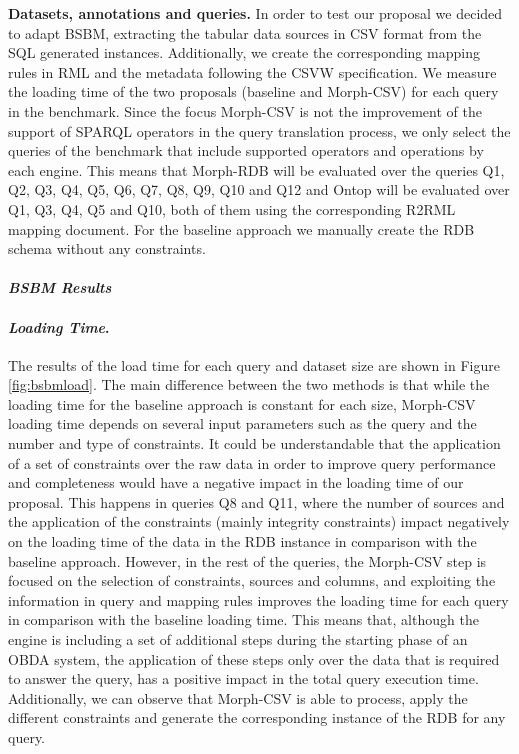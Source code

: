  
\noindent\textbf{Datasets, annotations and queries.} In order to test our proposal we decided to adapt BSBM, extracting the tabular data sources in CSV format from the SQL generated instances. Additionally, we create the corresponding mapping rules in RML and the metadata following the CSVW specification. We measure the loading time of the two proposals (baseline and Morph-CSV) for each query in the benchmark. Since the focus Morph-CSV is not the improvement of the support of SPARQL operators in the query translation process, we only select the queries of the benchmark that include supported operators and operations by each engine. This means that Morph-RDB will be evaluated over the queries  Q1, Q2, Q3, Q4, Q5, Q6, Q7, Q8, Q9, Q10 and Q12  and Ontop will be evaluated over Q1, Q3, Q4, Q5 and Q10, both of them using the corresponding R2RML mapping document. For the baseline approach we manually create the RDB schema without any constraints.



\noindent\paragraph*{\textit{BSBM Results}}

\noindent\paragraph*{\textit{Loading Time}.}
The results of the load time for each query and dataset size are shown in Figure \ref{fig:bsbmload}. The main difference between the two methods is that while the loading time for the baseline approach is constant for each size, Morph-CSV loading time depends on several input parameters such as the query and the number and type of constraints. It could be understandable that the application of a set of constraints over the raw data in order to improve query performance and completeness would have a negative impact in the loading time of our proposal. This happens in queries Q8 and Q11, where the number of sources and the application of the constraints (mainly integrity constraints)  impact negatively on the loading time of the data in the RDB instance in comparison with the baseline approach. However, in the rest of the queries, the Morph-CSV step is focused on the selection of constraints, sources and columns, and exploiting the information in query and mapping rules improves the loading time for each query in comparison with the baseline loading time. This means that, although the engine is including a set of additional steps during the starting phase of an OBDA system, the application of these steps only over the data that is required to answer the query, has a positive impact in the total query execution time. Additionally, we can observe that Morph-CSV is able to process, apply the different constraints and generate the corresponding instance of the RDB for any query.

